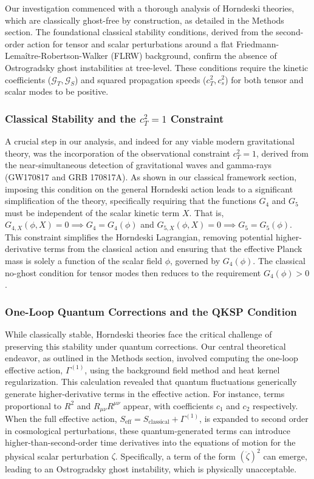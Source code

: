 \documentclass[twocolumn]{aastex631}
\begin{document}
Our investigation commenced with a thorough analysis of Horndeski theories, which are classically ghost-free by construction, as detailed in the Methods section. The foundational classical stability conditions, derived from the second-order action for tensor and scalar perturbations around a flat Friedmann-Lemaître-Robertson-Walker (FLRW) background, confirm the absence of Ostrogradsky ghost instabilities at tree-level. These conditions require the kinetic coefficients ($\mathcal{G}_T, \mathcal{G}_S$) and squared propagation speeds ($c_T^2, c_s^2$) for both tensor and scalar modes to be positive.

\subsubsection{Classical Stability and the $c_T^2=1$ Constraint}
A crucial step in our analysis, and indeed for any viable modern gravitational theory, was the incorporation of the observational constraint $c_T^2=1$, derived from the near-simultaneous detection of gravitational waves and gamma-rays (GW170817 and GRB 170817A). As shown in our classical framework section, imposing this condition on the general Horndeski action leads to a significant simplification of the theory, specifically requiring that the functions $G_4$ and $G_5$ must be independent of the scalar kinetic term $X$. That is, $G_{4,X}(\phi, X) = 0 \implies G_4 = G_4(\phi)$ and $G_{5,X}(\phi, X) = 0 \implies G_5 = G_5(\phi)$. This constraint simplifies the Horndeski Lagrangian, removing potential higher-derivative terms from the classical action and ensuring that the effective Planck mass is solely a function of the scalar field $\phi$, governed by $G_4(\phi)$. The classical no-ghost condition for tensor modes then reduces to the requirement $G_4(\phi) > 0$.

\subsubsection{One-Loop Quantum Corrections and the QKSP Condition}
While classically stable, Horndeski theories face the critical challenge of preserving this stability under quantum corrections. Our central theoretical endeavor, as outlined in the Methods section, involved computing the one-loop effective action, $\Gamma^{(1)}$, using the background field method and heat kernel regularization. This calculation revealed that quantum fluctuations generically generate higher-derivative terms in the effective action. For instance, terms proportional to $R^2$ and $R_{\mu\nu}R^{\mu\nu}$ appear, with coefficients $c_1$ and $c_2$ respectively. When the full effective action, $S_{\text{eff}} = S_{\text{classical}} + \Gamma^{(1)}$, is expanded to second order in cosmological perturbations, these quantum-generated terms can introduce higher-than-second-order time derivatives into the equations of motion for the physical scalar perturbation $\zeta$. Specifically, a term of the form $(\ddot{\zeta})^2$ can emerge, leading to an Ostrogradsky ghost instability, which is physically unacceptable.
\end{document}
